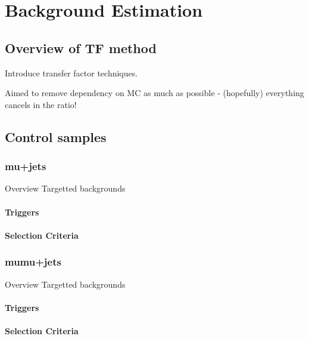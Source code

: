\chapter{Background Estimation}

\ifpdf
    \graphicspath{{Chapter6/Figs/Raster/}{Chapter6/Figs/PDF/}{Chapter6/Figs/}}
\else
    \graphicspath{{Chapter6/Figs/Vector/}{Chapter6/Figs/}}
\fi


\section{Overview of TF method}  %
\label{sec:background_overview}
Introduce transfer factor techniques.

Aimed to remove dependency on MC as much as possible - (hopefully) everything cancels in 
the ratio!


\section{Control samples}  %
\label{sec:background_control}

\subsection{mu+jets}
Overview
Targetted backgrounds
\subsubsection{Triggers}
\subsubsection{Selection Criteria}

\subsection{mumu+jets}
Overview
Targetted backgrounds
\subsubsection{Triggers}
\subsubsection{Selection Criteria}

